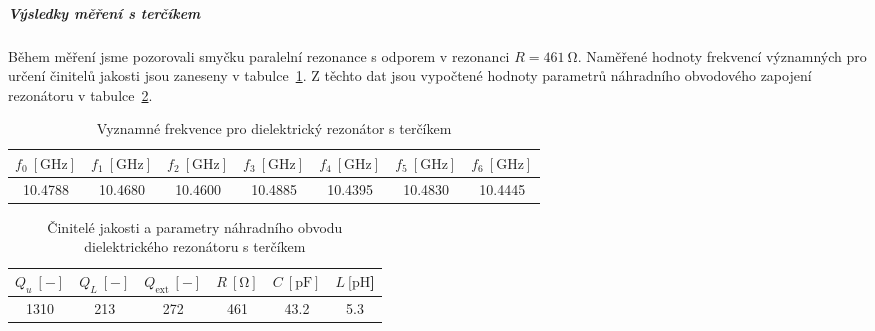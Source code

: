 \documentclass[11pt,a4paper]{article}
\newcommand{\Ohm}{\mathrm{\Omega}}
\newcommand{\GHz}{\mathrm{GHz}}
\begin{document}
\subparagraph*{Výsledky měření s terčíkem} Během měření jsme pozorovali smyčku paralelní rezonance s odporem v rezonanci $R = 461\ \Ohm$. Naměřené hodnoty frekvencí významných pro určení činitelů jakosti jsou zaneseny v tabulce~\ref{table:dielektricky-rezonator-s-tercikem-frekvence}. Z těchto dat jsou vypočtené hodnoty parametrů náhradního obvodového zapojení rezonátoru v tabulce~\ref{table:dielektricky-rezonator-s-tercikem-hodnoty}.
\begin{table}[!ht]
\centering
\begin{tabular}{|c|c|c|c|c|c|c|}
    \hline
    $f_0\ [\GHz]$ & $f_1\ [\GHz]$ & $f_2\ [\GHz]$ & $f_3\ [\GHz]$ & $f_4\ [\GHz]$ & $f_5\ [\GHz]$ & $f_6\ [\GHz]$\\
    \hline\hline
    10.4788 & 10.4680 & 10.4600 & 10.4885 & 10.4395 & 10.4830 & 10.4445\\
    \hline
\end{tabular}
\caption{\label{table:dielektricky-rezonator-s-tercikem-frekvence}Vyznamné frekvence pro dielektrický rezonátor s terčíkem}
\end{table}
\begin{table}[!ht]
\centering
\begin{tabular}{|c|c|c|c|c|c|}
    \hline
    $Q_u\ [-]$ & $Q_L\ [-]$ & $Q_{\mathrm{ext}}\ [-]$ & $R\ [\mathrm{\Omega}]$ & $C\ [\mathrm{pF}]$ & $L\ [\mathrm{pH}$]\\
    \hline\hline
    1310 & 213 & 272 & 461 & 43.2 & 5.3\\
    \hline
\end{tabular}
\caption{\label{table:dielektricky-rezonator-s-tercikem-hodnoty}Činitelé jakosti a parametry náhradního obvodu dielektrického rezonátoru s terčíkem}
\end{table}
\end{document}
